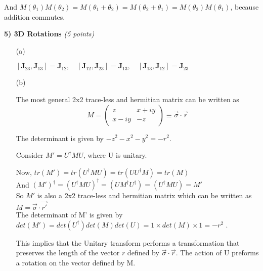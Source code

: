 {{\begin{itemize}
And $M(\theta_1)M(\theta_2) = M(\theta_1 + \theta_2) = M(\theta_2 + \theta_1) = M(\theta_2)M(\theta_1)$, because addition commutes.

\end{itemize}

\vspace*{0.25in}

\textbf{5) 3D Rotations } \hfill \textit{(5 points)}
\begin{itemize}
\item[(a)]{

${ [{\boldsymbol {J}}_{23},{\boldsymbol {J}}_{13}]={\boldsymbol {J}}_{12},\quad [{\boldsymbol {J}}_{12},{\boldsymbol {J}}_{23}]={\boldsymbol {J}}_{13},\quad [{\boldsymbol {J}}_{13},{\boldsymbol {J}}_{12}]={\boldsymbol {J}}_{23}}$


}
\item[(b)]{

The most general 2x2 trace-less and hermitian matrix can be written as
\begin{equation*}
M = \begin{pmatrix} z &  x+iy  \\ x-iy  & -z \end{pmatrix} \equiv \vec{\sigma} \cdot \vec{r}
\end{equation*}

The determinant is given by $-z^2 - x^2 -y^2 = -r^2$. 

Consider $M'=U^{\dagger}MU$, where U is unitary.

Now, $tr(M') = tr(U^{\dagger}MU) = tr(UU^{\dagger}M) = tr(M)$\\

And $(M')^\dagger = (U^{\dagger}MU)^\dagger = (U M^{\dagger} U^{\dagger}) = (U^\dagger M U) = M'$\\

So $M'$ is also a 2x2 trace-less and hermitian matrix which can be written as $M = \vec{\sigma} \cdot \vec{r'}$\\

The determinant of M' is given by $det(M') = det(U^{\dagger})det(M)det(U) = 1 \times det(M) \times 1 = -r^2 $ . 

This implies that the Unitary transform performs a transformation that preserves the length of the vector $r$ defined by $\vec{\sigma} \cdot \vec{r}$.
The action of U preforms a rotation on the vector defined by M.

}


\end{itemize}}}
